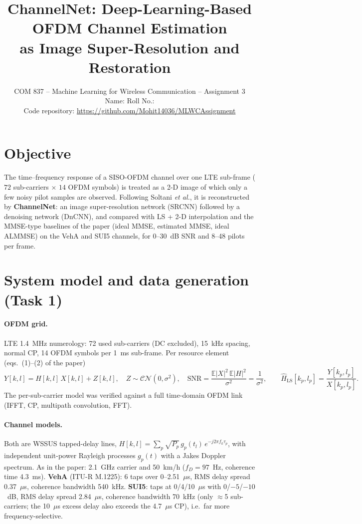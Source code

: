 \documentclass[10pt,a4paper]{article}
\title{\vspace{-1.2cm}\textbf{ChannelNet: Deep-Learning-Based OFDM Channel Estimation\\as Image Super-Resolution and Restoration}}
\author{COM 837 -- Machine Learning for Wireless Communication -- Assignment 3\\
Name: \studentname \qquad Roll No.: \rollno\\
Code repository: \url{https://github.com/Mohit14036/MLWCAssignment}}
\date{\vspace{-0.9cm}}
\begin{document}
\maketitle

\section{Objective}

The time--frequency response of a SISO-OFDM channel over one LTE sub-frame ($72$ sub-carriers $\times$ $14$
OFDM symbols) is treated as a 2-D image of which only a few noisy pilot samples are observed. Following
Soltani \emph{et al.}, it is reconstructed by \textbf{ChannelNet}: an image super-resolution
network (SRCNN) followed by a denoising network (DnCNN), and compared with LS + 2-D
interpolation and the MMSE-type baselines of the paper (ideal MMSE, estimated MMSE, ideal
ALMMSE) on the VehA and SUI5 channels, for 0--30~dB SNR and 8--48 pilots per frame.

\section{System model and data generation (Task 1)}

\paragraph{OFDM grid.} LTE 1.4~MHz numerology: 72 used sub-carriers (DC excluded), 15~kHz spacing, normal
CP, 14 OFDM symbols per 1~ms sub-frame. Per resource element (eqs.~(1)--(2) of the paper)
\begin{equation}
  Y[k,l] = H[k,l]\,X[k,l] + Z[k,l],\quad Z\sim\mathcal{CN}(0,\sigma^2),\quad
  \mathrm{SNR}=\frac{\mathbb{E}|X|^2\,\mathbb{E}|H|^2}{\sigma^2}=\frac{1}{\sigma^2},\qquad
  \hat H_{\mathrm{LS}}[k_p,l_p] = \frac{Y[k_p,l_p]}{X[k_p,l_p]} .
\end{equation}
The per-sub-carrier model was verified against a full time-domain OFDM link (IFFT, CP, multipath
convolution, FFT).

\paragraph{Channel models.} Both are WSSUS tapped-delay lines,
$H[k,l] = \sum_{p} \sqrt{P_p}\, g_p(t_l)\, e^{-j2\pi f_k \tau_p}$, with independent unit-power Rayleigh
processes $g_p(t)$ with a Jakes Doppler spectrum. As in the paper: 2.1~GHz carrier and 50~km/h
($f_D = 97$~Hz, coherence time 4.3~ms). \textbf{VehA} (ITU-R M.1225): 6 taps over 0--2.51~$\mu$s, RMS delay
spread 0.37~$\mu$s, coherence bandwidth 540~kHz. \textbf{SUI5}: taps at 0/4/10~$\mu$s with
0/$-5$/$-10$~dB, RMS delay spread 2.84~$\mu$s, coherence bandwidth 70~kHz (only $\approx$5 sub-carriers;
the 10~$\mu$s excess delay also exceeds the 4.7~$\mu$s CP), i.e.\ far more frequency-selective.
\end{document}
